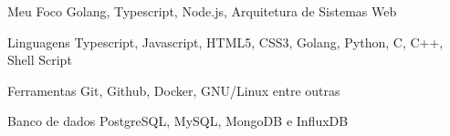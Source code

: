
\begin{cvskills}
  \cvskill
    {Meu Foco}
    {Golang, Typescript, Node.js, Arquitetura de Sistemas Web}
  
  \cvskill
    {Linguagens}
    {Typescript, Javascript, HTML5, CSS3, Golang, Python, C, C++, Shell Script}

  \cvskill
    {Ferramentas}
    {Git, Github, Docker, GNU/Linux entre outras }

  \cvskill
    {Banco de dados}
    {PostgreSQL, MySQL, MongoDB e InfluxDB}
    
\end{cvskills}
